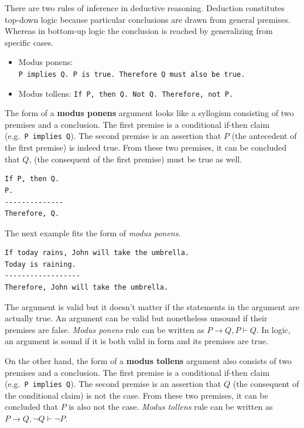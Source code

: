 \documentclass[
]{book}
\providecommand{\tightlist}{%
  \setlength{\itemsep}{0pt}\setlength{\parskip}{0pt}}
\begin{document}
There are two rules of inference in deductive reasoning. Deduction constitutes top-down logic because particular conclusions are drawn from general premises. Whereas in bottom-up logic the conclusion is reached by generalizing from specific cases.

\begin{itemize}
\tightlist
\item
  Modus ponens: \texttt{P\ implies\ Q.\ P\ is\ true.\ Therefore\ Q\ must\ also\ be\ true.}
\item
  Modus tollens: \texttt{If\ P,\ then\ Q.\ Not\ Q.\ Therefore,\ not\ P.}
\end{itemize}

The form of a \textbf{modus ponens} argument looks like a syllogism consisting of two premises and a conclusion. The first premise is a conditional if-then claim (e.g.~\texttt{P\ implies\ Q}). The second premise is an assertion that \(P\) (the antecedent of the first premise) is indeed true. From these two premises, it can be concluded that \(Q\), (the consequent of the first premise) must be true as well.

\begin{verbatim}
If P, then Q.
P.
--------------
Therefore, Q.
\end{verbatim}

The next example fits the form of \emph{modus ponens}.

\begin{verbatim}
If today rains, John will take the umbrella.
Today is raining.
------------------
Therefore, John will take the umbrella.
\end{verbatim}

The argument is valid but it doesn't matter if the statements in the argument are actually true. An argument can be valid but nonetheless unsound if their premises are false. \emph{Modus ponens} rule can be written as \(P \rightarrow Q, P \vdash Q\). In logic, an argument is sound if it is both valid in form and its premises are true.

On the other hand, the form of a \textbf{modus tollens} argument also consists of two premises and a conclusion. The first premise is a conditional if-then claim (e.g.~\texttt{P\ implies\ Q}). The second premise is an assertion that \(Q\) (the consequent of the conditional claim) is not the case. From these two premises, it can be concluded that \(P\) is also not the case. \emph{Modus tollens} rule can be written as \(P \rightarrow Q, \lnot Q \vdash \lnot P\).
\end{document}
